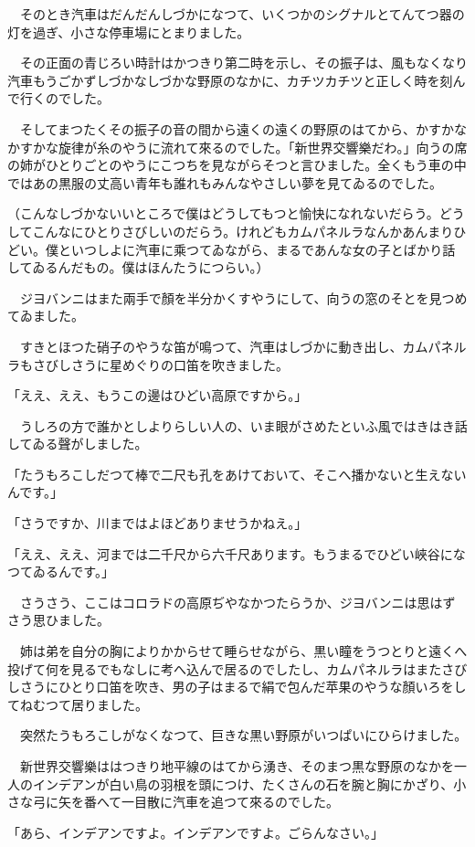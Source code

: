 \documentclass[tate,paper=b6j,jafontsize=9pt]{jlreq}
\begin{document}
　そのとき汽車はだんだんしづかになつて、いくつかのシグナルとてんてつ器の灯を過ぎ、小さな停車場にとまりました。

　その正面の青じろい時計はかつきり第二時を示し、その振子は、風もなくなり汽車もうごかずしづかなしづかな野原のなかに、カチツカチツと正しく時を刻んで行くのでした。

　そしてまつたくその振子の音の間から遠くの遠くの野原のはてから、かすかなかすかな旋律が糸のやうに流れて來るのでした。「新世界交響樂だわ。」向うの席の姉がひとりごとのやうにこつちを見ながらそつと言ひました。全くもう車の中ではあの黒服の丈高い青年も誰れもみんなやさしい夢を見てゐるのでした。

（こんなしづかないいところで僕はどうしてもつと愉快になれないだらう。どうしてこんなにひとりさびしいのだらう。けれどもカムパネルラなんかあんまりひどい。僕といつしよに汽車に乘つてゐながら、まるであんな女の子とばかり話してゐるんだもの。僕はほんたうにつらい。）

　ジヨバンニはまた兩手で顏を半分かくすやうにして、向うの窓のそとを見つめてゐました。

　すきとほつた硝子のやうな笛が鳴つて、汽車はしづかに動き出し、カムパネルラもさびしさうに星めぐりの口笛を吹きました。

「ええ、ええ、もうこの邊はひどい高原ですから。」

　うしろの方で誰かとしよりらしい人の、いま眼がさめたといふ風ではきはき話してゐる聲がしました。

「たうもろこしだつて棒で二尺も孔をあけておいて、そこへ播かないと生えないんです。」

「さうですか、川まではよほどありませうかねえ。」

「ええ、ええ、河までは二千尺から六千尺あります。もうまるでひどい峽谷になつてゐるんです。」

　さうさう、ここはコロラドの高原ぢやなかつたらうか、ジヨバンニは思はずさう思ひました。

　姉は弟を自分の胸によりかからせて睡らせながら、黒い瞳をうつとりと遠くへ投げて何を見るでもなしに考へ込んで居るのでしたし、カムパネルラはまたさびしさうにひとり口笛を吹き、男の子はまるで絹で包んだ苹果のやうな顏いろをしてねむつて居りました。

　突然たうもろこしがなくなつて、巨きな黒い野原がいつぱいにひらけました。

　新世界交響樂ははつきり地平線のはてから湧き、そのまつ黒な野原のなかを一人のインデアンが白い鳥の羽根を頭につけ、たくさんの石を腕と胸にかざり、小さな弓に矢を番へて一目散に汽車を追つて來るのでした。

「あら、インデアンですよ。インデアンですよ。ごらんなさい。」
\end{document}
